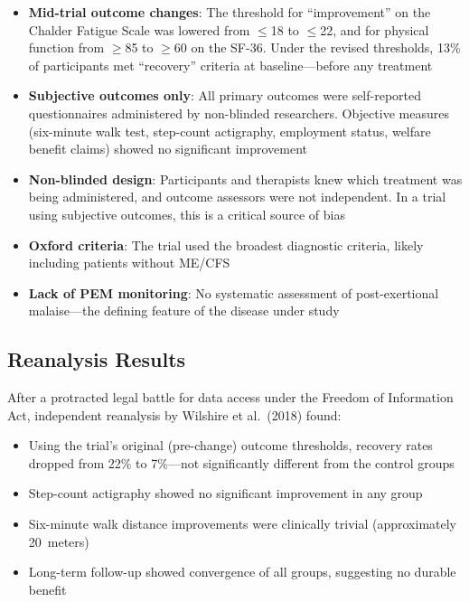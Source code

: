 \begin{itemize}
    \item \textbf{Mid-trial outcome changes}: The threshold for ``improvement'' on the Chalder Fatigue Scale was lowered from $\leq$18 to $\leq$22, and for physical function from $\geq$85 to $\geq$60 on the SF-36. Under the revised thresholds, 13\% of participants met ``recovery'' criteria at baseline---before any treatment~\cite{Wilshire2018}
    \item \textbf{Subjective outcomes only}: All primary outcomes were self-reported questionnaires administered by non-blinded researchers. Objective measures (six-minute walk test, step-count actigraphy, employment status, welfare benefit claims) showed no significant improvement~\cite{geraghty2019cognitive}
    \item \textbf{Non-blinded design}: Participants and therapists knew which treatment was being administered, and outcome assessors were not independent. In a trial using subjective outcomes, this is a critical source of bias
    \item \textbf{Oxford criteria}: The trial used the broadest diagnostic criteria, likely including patients without ME/CFS
    \item \textbf{Lack of PEM monitoring}: No systematic assessment of post-exertional malaise---the defining feature of the disease under study
\end{itemize}

\subsection{Reanalysis Results}

After a protracted legal battle for data access under the Freedom of Information Act, independent reanalysis by Wilshire et al.\ (2018) found:

\begin{itemize}
    \item Using the trial's original (pre-change) outcome thresholds, recovery rates dropped from 22\% to 7\%---not significantly different from the control groups
    \item Step-count actigraphy showed no significant improvement in any group
    \item Six-minute walk distance improvements were clinically trivial (approximately 20~meters)
    \item Long-term follow-up showed convergence of all groups, suggesting no durable benefit
\end{itemize}

